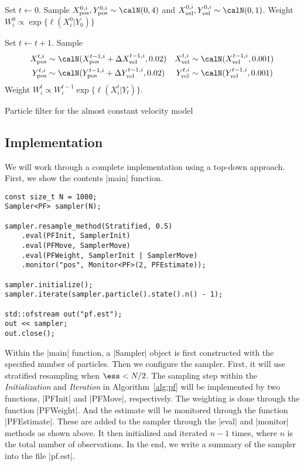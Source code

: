 \begin{algorithm}[t]
  \begin{algorithmic}
    \tophrule
    \STATE {}
    \STATE Set $t\leftarrow0$.
    \STATE Sample $\xpos^{0,i},\ypos^{0,i}\sim\calN(0,4)$ and
    $\xvel^{0,i},\yvel^{0,i}\sim\calN(0,1)$.
    \STATE Weight $W_i^0 \propto \exp\{\ell(X_i^0 \vert Y_0)\}$

    \REPEAT
    \STATE {}
    \STATE Set $t\leftarrow t + 1$.
    \STATE Sample
    \begin{align*}
      \xpos^{t,i}&\sim\calN(\xpos^{t-1,i} + \Delta\xvel^{t-1,i}, 0.02) &
      \xvel^{t,i}&\sim\calN(\xvel^{t-1,i}, 0.001) \\
      \ypos^{t,i}&\sim\calN(\ypos^{t-1,i} + \Delta\yvel^{t-1,i}, 0.02) &
      \yvel^{t,i}&\sim\calN(\yvel^{t-1,i}, 0.001)
    \end{align*}
    \STATE Weight $W_i^t \propto W_i^{t - 1}\exp\{\ell(X_i^t \vert Y_t)\}$.
    \bottomhrule
  \end{algorithmic}
  \caption{Particle filter for the almost constant velocity model}
  \label{alg:pf}
\end{algorithm}

\subsection{Implementation}
\label{sub:Implementation (PF)}

We will work through a complete implementation using a top-down approach.
First, we show the contents |main| function.
\begin{verbatim}
const size_t N = 1000;
Sampler<PF> sampler(N);

sampler.resample_method(Stratified, 0.5)
    .eval(PFInit, SamplerInit)
    .eval(PFMove, SamplerMove)
    .eval(PFWeight, SamplerInit | SamplerMove)
    .monitor("pos", Monitor<PF>(2, PFEstimate));

sampler.initialize();
sampler.iterate(sampler.particle().state().n() - 1);

std::ofstream out("pf.est");
out << sampler;
out.close();
\end{verbatim}
Within the |main| function, a |Sampler| object is first constructed with the
specified number of particles. Then we configure the sampler. First, it will
use stratified resampling when $\ess < N / 2$. The sampling step within the
\emph{Initialization} and \emph{Iteration} in Algorithm~\ref{alg:pf} will be
implemented by two functions, |PFInit| and |PFMove|, respectively. The
weighting is done through the function |PFWeight|. And the estimate will be
monitored through the function |PFEstimate|. These are added to the sampler
through the |eval| and |monitor| methods as shown above. It then initialized
and iterated $n - 1$ times, where $n$ is the total number of observations. In
the end, we write a summary of the sampler into the file |pf.est|.

